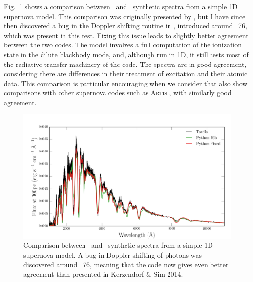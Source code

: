 Fig.~\ref{fig:tardis_spec} shows a comparison 
between \tar\ and \py\ synthetic spectra from 
a simple 1D supernova model. This comparison was originally presented by
\cite{kerzendorfsim}, but I have since then discovered a bug in the Doppler shifting
routine in \py, introduced around \py\ 76, which was present in this test. 
Fixing this issue leads to slightly better agreement between the two codes. 
The model involves a full computation of the ionization state in the 
dilute blackbody mode, and, although run in 1D, it 
still tests most of the radiative transfer
machinery of the code. The spectra are in good agreement, considering
there are differences in their treatment of excitation and their atomic data.
This comparison is particular encouraging when we consider
that \cite{kerzendorfsim} also show comparisons with other supernova
codes such as \textsc{Artis} \citep{kromersim2009}, 
with similarly good agreement.

\begin{figure}
\centering
\includegraphics[width=1.0\textwidth]{figures/03-radtrans/tardispython_thesis.png}
\caption[Comparison between \tar\ and \py\ synthetic spectra from 
a simple 1D supernova model.]
{
Comparison between \tar\ and \py\ synthetic spectra from 
a simple 1D supernova model. A bug in Doppler shifting of
photons was discovered around \py\ 76, meaning that the code now gives
even better agreement than presented in Kerzendorf \& Sim 2014.
}
\label{fig:tardis_spec}
\end{figure}

